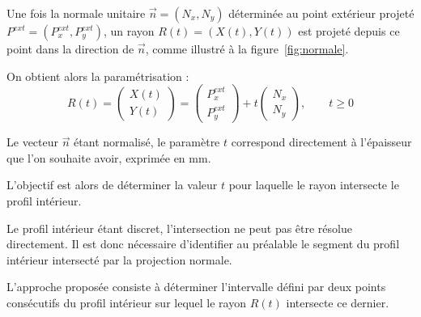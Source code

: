\documentclass[14pt]{extarticle}
\begin{document}
Une fois la normale unitaire \(\vec n = (N_x,N_y)\) déterminée au point
extérieur projeté \(P^{ext}=(P_x^{ext},P_y^{ext})\), un rayon \(R(t)=(X(t),Y(t))\) est projeté depuis ce point
dans la direction de \(\vec n\), comme illustré à la
figure~\ref{fig:normale}.

On obtient alors la paramétrisation :
\begin{equation}
R(t)=
\begin{pmatrix}
X(t) \\
Y(t)
\end{pmatrix}
=
\begin{pmatrix}
P_x^{ext} \\
P_y^{ext}
\end{pmatrix}
+
t
\begin{pmatrix}
N_x \\
N_y
\end{pmatrix},
\qquad t \ge 0
\tag{4}
\end{equation}

Le vecteur \(\vec n\) étant normalisé, le paramètre \(t\) correspond
directement à l'épaisseur que l'on souhaite avoir, exprimée en mm.

L'objectif est alors de déterminer la valeur \(t\) pour laquelle le
rayon intersecte le profil intérieur.





Le profil intérieur étant discret, l’intersection ne peut pas être résolue directement.
Il est donc nécessaire d’identifier au préalable le segment du profil intérieur
intersecté par la projection normale.

L’approche proposée consiste à déterminer l’intervalle défini par deux points consécutifs
du profil intérieur sur lequel le rayon \(R(t)\) intersecte ce dernier.
\end{document}
